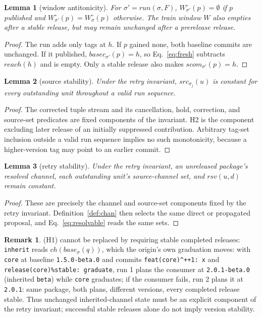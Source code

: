\documentclass[10pt,conference]{IEEEtran}
\newtheorem{lemma}{Lemma}
\theoremstyle{definition}
\newcommand{\code}[1]{\texttt{#1}}
\newtheorem{remarknum}{Remark}
\begin{document}
\begin{lemma}[window antitonicity]
\label{lem:w}
For $\sigma' = \mathit{run}(\sigma,F)$, $W^\circ_{\sigma'}(p)=\emptyset$
if $p$ published and $W^\circ_{\sigma'}(p)=W^\circ_\sigma(p)$ otherwise.
The train window $W$ also empties after a stable release, but may remain
unchanged after a prerelease release.
\end{lemma}
\begin{proof}
The run adds only tags at $h$. If $p$ gained none, both baseline commits
are unchanged. If it published, $\mathit{basec}_{\sigma'}(p)=h$, so
Eq.~\ref{eq:fresh} subtracts $\mathit{reach}(h)$ and is empty. Only a
stable release also makes $\mathit{scom}_{\sigma'}(p)=h$.
\end{proof}

\begin{lemma}[source stability]
\label{lem:s}
Under the retry invariant, $\mathit{src}_{\sigma_j}(u)$ is constant for
every outstanding unit throughout a valid run sequence.
\end{lemma}
\begin{proof}
The corrected tuple stream and its cancellation, hold, correction, and
source-set predicates are fixed components of the invariant. H2 is the
component excluding later release of an initially suppressed contribution.
Arbitrary tag-set inclusion outside a valid run sequence implies no such
monotonicity, because a higher-version tag may point to an earlier commit.
\end{proof}

\begin{lemma}[retry stability]
\label{lem:c}
Under the retry invariant, an unreleased package's resolved channel,
each outstanding unit's source-channel set, and
$\mathit{rsv}(u,d)$ remain constant.
\end{lemma}
\begin{proof}
These are precisely the channel and source-set components fixed by the
retry invariant. Definition~\ref{def:chan} then selects the same direct
or propagated proposal, and Eq.~\ref{eq:resolvable} reads the same sets.
\end{proof}

\begin{remarknum}
\label{rem:drift}
(H1) cannot be replaced by requiring stable completed releases: \code{inherit} reads
$\mathit{ch}(\mathit{base}_\sigma(q))$, which the origin's own
graduation moves: with \code{core} at baseline \code{1.5.0-beta.0} and
commits \code{feat(core)\^{}++1:~x} and
\code{release(core)\%stable:~graduate}, run 1 plans the consumer at
\code{2.0.1-beta.0} (inherited \code{beta}) while \code{core}
graduates; if the consumer fails, run 2 plans it at \code{2.0.1}:
same package, both plans, different versions, every completed release
stable. Thus unchanged inherited-channel state must be an explicit component of the
retry invariant; successful stable releases alone do not imply version stability.
\end{remarknum}
\end{document}
